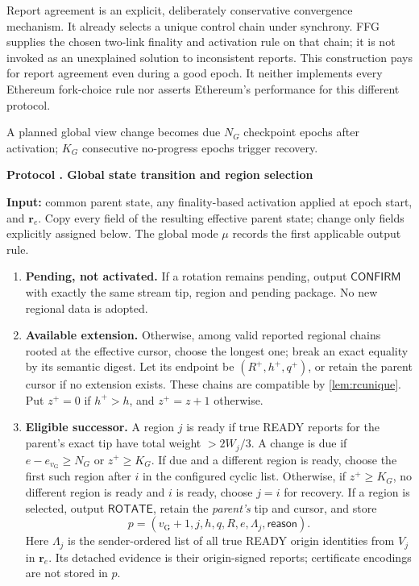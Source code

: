 \documentclass[11pt,a4paper,onecolumn]{article}
\newcommand{\gv}{v_{\mathrm G}}
\newcommand{\Tag}[1]{\mathsf{#1}}
\theoremstyle{remark}\newtheorem{example}[definition]{Example}
\newcounter{protocol}
\newenvironment{protocol}[2]{\refstepcounter{protocol}\label{#1}\begin{mdframed}[nobreak=true,linewidth=.6pt,skipabove=10pt,skipbelow=10pt,innertopmargin=8pt,innerbottommargin=8pt]\small\raggedright\noindent\textbf{Protocol \theprotocol. #2}\par\smallskip}{\end{mdframed}}
\begin{document}
Report agreement is an explicit, deliberately conservative convergence mechanism.
It already selects a unique control chain under synchrony. FFG supplies the
chosen two-link finality and activation rule on that chain; it is not invoked
as an unexplained solution to inconsistent reports. This construction pays for
report agreement even during a good epoch. It neither implements every Ethereum
fork-choice rule nor asserts Ethereum's performance for this different protocol.

A planned global view change becomes due $N_G$ checkpoint epochs after
activation; $K_G$ consecutive no-progress epochs trigger recovery.

\begin{protocol}{alg:gtransition}{Global state transition and region selection}
\textbf{Input:} common parent state, any finality-based activation applied at
epoch start, and $\mathbf r_e$. Copy every field of the resulting effective
parent state; change only fields explicitly assigned below. The global mode
$\mu$ records the first applicable output rule.
\begin{enumerate}[label=\textbf{T\arabic*.}]
\item \textbf{Pending, not activated.} If a rotation remains pending, output
$\Tag{CONFIRM}$ with exactly the same stream tip, region and pending package.
No new regional data is adopted.
\item \textbf{Available extension.} Otherwise, among valid reported regional
chains rooted at the effective cursor, choose the longest one; break an exact
equality by its semantic digest. Let its endpoint be $(R^+,h^+,q^+)$, or retain
the parent cursor if no extension exists. These chains are compatible by
\cref{lem:rcunique}. Put $z^+=0$ if $h^+>h$, and $z^+=z+1$ otherwise.
\item \textbf{Eligible successor.} A region $j$ is ready if true READY
reports for the parent's exact tip have total weight $>2W_j/3$.
A change is due if $e-e_{\gv}\geq N_G$ or $z^+\geq K_G$.
If due and a different region is ready, choose the first such region after $i$
in the configured cyclic list. Otherwise, if $z^+\geq K_G$, no different region
is ready and $i$ is ready, choose $j=i$ for recovery. If a region is selected,
output $\Tag{ROTATE}$, retain the \emph{parent's} tip and cursor, and store
\[
 p=(\gv+1,j,h,q,R,e,\Lambda_j,\mathsf{reason}).
\]
Here $\Lambda_j$ is the sender-ordered list of all true READY origin
identities from $V_j$ in $\mathbf r_e$. Its detached evidence is their
origin-signed reports; certificate encodings are not stored in $p$.

\end{enumerate}
\end{protocol}
\end{document}
